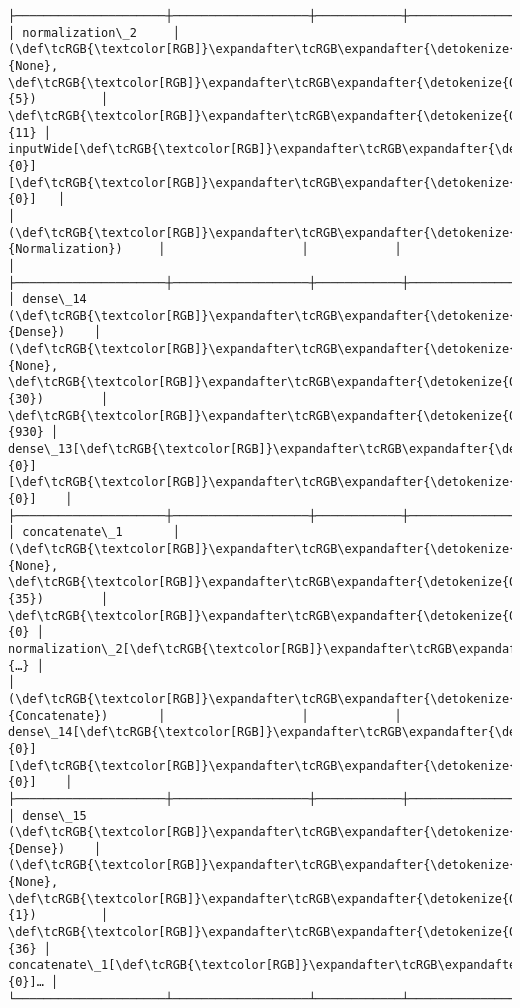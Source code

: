 \documentclass[12pt letter]{report}
\begin{document}
\begin{Verbatim}[commandchars=\\\{\}]
├─────────────────────┼───────────────────┼────────────┼───────────────────┤
│ normalization\_2     │ (\def\tcRGB{\textcolor[RGB]}\expandafter\tcRGB\expandafter{\detokenize{0,215,255}}{None}, \def\tcRGB{\textcolor[RGB]}\expandafter\tcRGB\expandafter{\detokenize{0,175,0}}{5})         │         \def\tcRGB{\textcolor[RGB]}\expandafter\tcRGB\expandafter{\detokenize{0,175,0}}{11} │ inputWide[\def\tcRGB{\textcolor[RGB]}\expandafter\tcRGB\expandafter{\detokenize{0,175,0}}{0}][\def\tcRGB{\textcolor[RGB]}\expandafter\tcRGB\expandafter{\detokenize{0,175,0}}{0}]   │
│ (\def\tcRGB{\textcolor[RGB]}\expandafter\tcRGB\expandafter{\detokenize{0,135,255}}{Normalization})     │                   │            │                   │
├─────────────────────┼───────────────────┼────────────┼───────────────────┤
│ dense\_14 (\def\tcRGB{\textcolor[RGB]}\expandafter\tcRGB\expandafter{\detokenize{0,135,255}}{Dense})    │ (\def\tcRGB{\textcolor[RGB]}\expandafter\tcRGB\expandafter{\detokenize{0,215,255}}{None}, \def\tcRGB{\textcolor[RGB]}\expandafter\tcRGB\expandafter{\detokenize{0,175,0}}{30})        │        \def\tcRGB{\textcolor[RGB]}\expandafter\tcRGB\expandafter{\detokenize{0,175,0}}{930} │ dense\_13[\def\tcRGB{\textcolor[RGB]}\expandafter\tcRGB\expandafter{\detokenize{0,175,0}}{0}][\def\tcRGB{\textcolor[RGB]}\expandafter\tcRGB\expandafter{\detokenize{0,175,0}}{0}]    │
├─────────────────────┼───────────────────┼────────────┼───────────────────┤
│ concatenate\_1       │ (\def\tcRGB{\textcolor[RGB]}\expandafter\tcRGB\expandafter{\detokenize{0,215,255}}{None}, \def\tcRGB{\textcolor[RGB]}\expandafter\tcRGB\expandafter{\detokenize{0,175,0}}{35})        │          \def\tcRGB{\textcolor[RGB]}\expandafter\tcRGB\expandafter{\detokenize{0,175,0}}{0} │ normalization\_2[\def\tcRGB{\textcolor[RGB]}\expandafter\tcRGB\expandafter{\detokenize{0,175,0}}{…} │
│ (\def\tcRGB{\textcolor[RGB]}\expandafter\tcRGB\expandafter{\detokenize{0,135,255}}{Concatenate})       │                   │            │ dense\_14[\def\tcRGB{\textcolor[RGB]}\expandafter\tcRGB\expandafter{\detokenize{0,175,0}}{0}][\def\tcRGB{\textcolor[RGB]}\expandafter\tcRGB\expandafter{\detokenize{0,175,0}}{0}]    │
├─────────────────────┼───────────────────┼────────────┼───────────────────┤
│ dense\_15 (\def\tcRGB{\textcolor[RGB]}\expandafter\tcRGB\expandafter{\detokenize{0,135,255}}{Dense})    │ (\def\tcRGB{\textcolor[RGB]}\expandafter\tcRGB\expandafter{\detokenize{0,215,255}}{None}, \def\tcRGB{\textcolor[RGB]}\expandafter\tcRGB\expandafter{\detokenize{0,175,0}}{1})         │         \def\tcRGB{\textcolor[RGB]}\expandafter\tcRGB\expandafter{\detokenize{0,175,0}}{36} │ concatenate\_1[\def\tcRGB{\textcolor[RGB]}\expandafter\tcRGB\expandafter{\detokenize{0,175,0}}{0}]… │
└─────────────────────┴───────────────────┴────────────┴───────────────────┘

    \end{Verbatim}
\end{document}
